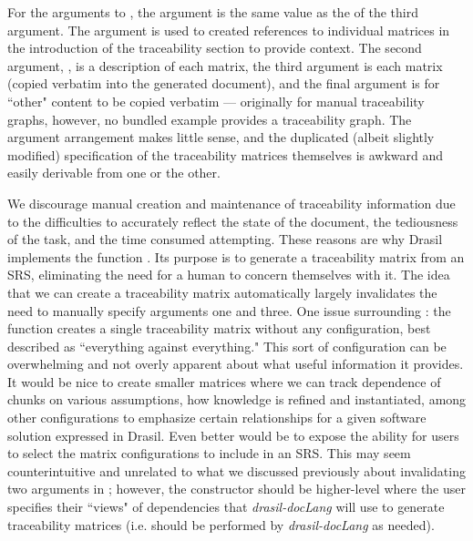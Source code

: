For the arguments to , the \haskell{[LabelledContent]} argument is the same value as the \haskell{[Contents]} of the third argument. The  argument is used to created references to individual matrices in the introduction of the traceability section to provide context. The second argument, \haskell{[Sentence]}, is a description of each matrix, the third argument is each matrix (copied verbatim into the generated document), and the final argument is for ``other" content to be copied verbatim --- originally for manual traceability graphs, however, no bundled example provides a traceability graph. The argument arrangement makes little sense, and the duplicated (albeit slightly modified) specification of the traceability matrices themselves is awkward and easily derivable from one or the other.

We discourage manual creation and maintenance of traceability information due to the difficulties to accurately reflect the state of the document, the tediousness of the task, and the time consumed attempting. These reasons are why Drasil implements the function . Its purpose is to generate a traceability matrix from an SRS, eliminating the need for a human to concern themselves with it. The idea that we can create a traceability matrix automatically largely invalidates the need to manually specify arguments one and three. One issue surrounding : the function creates a single traceability matrix without any configuration, best described as ``everything against everything." This sort of configuration can be overwhelming and not overly apparent about what useful information it provides. It would be nice to create smaller matrices where we can track dependence of chunks on various assumptions, how knowledge is refined and instantiated, among other configurations to emphasize certain relationships for a given software solution expressed in Drasil. Even better would be to expose the ability for users to select the matrix configurations to include in an SRS. This may seem counterintuitive and unrelated to what we discussed previously about  invalidating two arguments in ; however, the constructor should be higher-level where the user specifies their ``views" of dependencies that \textit{drasil-docLang} will use to generate traceability matrices (i.e.  should be performed by \textit{drasil-docLang} as needed). 

